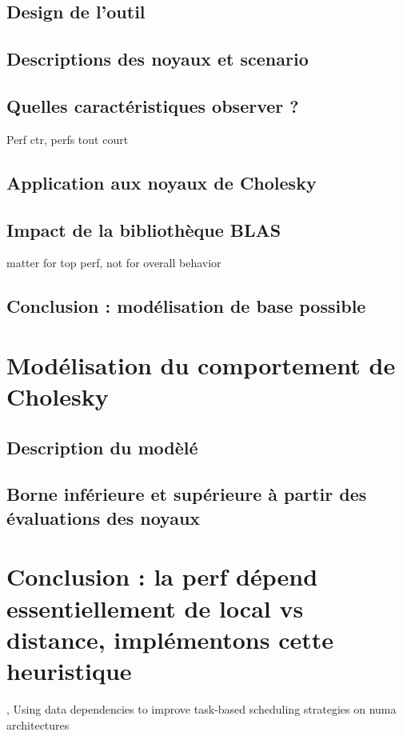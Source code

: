 \subsection{Design de l'outil}
\subsection{Descriptions des noyaux et scenario}
\subsection{Quelles caractéristiques observer ?}
Perf ctr, perfs tout court

\subsection{Application aux noyaux de Cholesky}
\subsection{Impact de la bibliothèque BLAS}

matter for top perf, not for overall behavior

\subsection{Conclusion : modélisation de base possible}

\section{Modélisation du comportement de Cholesky}
\subsection{Description du modèlé}
\subsection{Borne inférieure et supérieure à partir des évaluations des noyaux}

\section{Conclusion : la perf dépend essentiellement de local vs distance, implémentons cette heuristique}

%
\cite{Virouleau2016b}, Using data dependencies to improve task-based scheduling strategies on numa architectures

